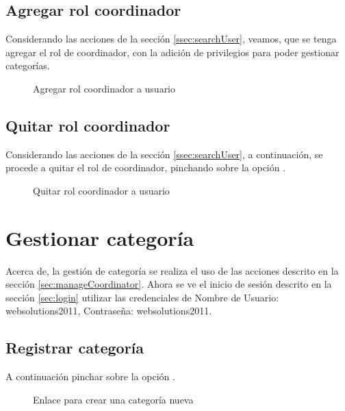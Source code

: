\subsection{Agregar rol coordinador}

Considerando las acciones de la sección \ref{ssec:searchUser}, veamos, que se
tenga agregar el rol de coordinador, con la adición de privilegios para poder
gestionar categorías.

\begin{figure}[!ht]
\centering
		\caption{Agregar rol coordinador a usuario}
\end{figure}

\subsection{Quitar rol coordinador}

Considerando las acciones de la sección \ref{ssec:searchUser}, a continuación,
se procede a quitar el rol de coordinador, pinchando sobre la opción 
.

\begin{figure}[!ht]
\centering
		\caption{Quitar rol coordinador a usuario}
\end{figure}


\section{Gestionar categoría}

Acerca de, la gestión de categoría se realiza el uso de las acciones descrito
en la sección \ref{sec:manageCoordinator}. Ahora se ve el inicio de sesión
descrito en la sección \ref{sec:login} utilizar las credenciales de Nombre de
Usuario: websolutions2011, Contraseña: websolutions2011.

\subsection{Registrar categoría}

A continuación pinchar sobre la opción .

\begin{figure}[!ht]
\centering
		\caption{Enlace para crear una categoría nueva}
\end{figure}


